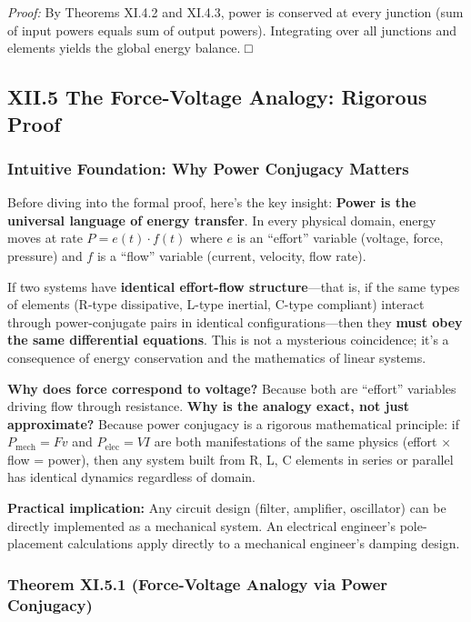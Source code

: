 \documentclass[
]{article}
\begin{document}
\emph{Proof:} By Theorems XI.4.2 and XI.4.3, power is conserved at every
junction (sum of input powers equals sum of output powers). Integrating
over all junctions and elements yields the global energy balance. □

\subsection{XII.5 The Force-Voltage Analogy: Rigorous
Proof}\label{xii.5-the-force-voltage-analogy-rigorous-proof}

\subsubsection{Intuitive Foundation: Why Power Conjugacy
Matters}\label{intuitive-foundation-why-power-conjugacy-matters}

Before diving into the formal proof, here's the key insight:
\textbf{Power is the universal language of energy transfer}. In every
physical domain, energy moves at rate \(P = e(t) \cdot f(t)\) where
\(e\) is an ``effort'' variable (voltage, force, pressure) and \(f\) is
a ``flow'' variable (current, velocity, flow rate).

If two systems have \textbf{identical effort-flow structure}---that is,
if the same types of elements (R-type dissipative, L-type inertial,
C-type compliant) interact through power-conjugate pairs in identical
configurations---then they \textbf{must obey the same differential
equations}. This is not a mysterious coincidence; it's a consequence of
energy conservation and the mathematics of linear systems.

\textbf{Why does force correspond to voltage?} Because both are
``effort'' variables driving flow through resistance. \textbf{Why is the
analogy exact, not just approximate?} Because power conjugacy is a
rigorous mathematical principle: if \(P_{\text{mech}} = Fv\) and
\(P_{\text{elec}} = VI\) are both manifestations of the same physics
(effort × flow = power), then any system built from R, L, C elements in
series or parallel has identical dynamics regardless of domain.

\textbf{Practical implication:} Any circuit design (filter, amplifier,
oscillator) can be directly implemented as a mechanical system. An
electrical engineer's pole-placement calculations apply directly to a
mechanical engineer's damping design.

\subsubsection{Theorem XI.5.1 (Force-Voltage Analogy via Power
Conjugacy)}\label{theorem-xi.5.1-force-voltage-analogy-via-power-conjugacy}
\end{document}
